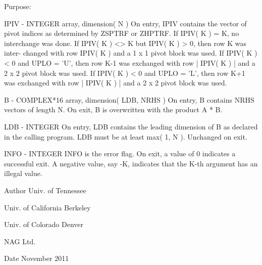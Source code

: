 \begin{DoxyParagraph}{Purpose\+: }
\begin{DoxyVerb}
  IPIV   - INTEGER array, dimension( N )
           On entry, IPIV contains the vector of pivot indices as
           determined by ZSPTRF or ZHPTRF.
           If IPIV( K ) = K, no interchange was done.
           If IPIV( K ) <> K but IPIV( K ) > 0, then row K was inter-
           changed with row IPIV( K ) and a 1 x 1 pivot block was used.
           If IPIV( K ) < 0 and UPLO = 'U', then row K-1 was exchanged
           with row | IPIV( K ) | and a 2 x 2 pivot block was used.
           If IPIV( K ) < 0 and UPLO = 'L', then row K+1 was exchanged
           with row | IPIV( K ) | and a 2 x 2 pivot block was used.

  B      - COMPLEX*16 array, dimension( LDB, NRHS )
           On entry, B contains NRHS vectors of length N.
           On exit, B is overwritten with the product A * B.

  LDB    - INTEGER
           On entry, LDB contains the leading dimension of B as
           declared in the calling program.  LDB must be at least
           max( 1, N ).
           Unchanged on exit.

  INFO   - INTEGER
           INFO is the error flag.
           On exit, a value of 0 indicates a successful exit.
           A negative value, say -K, indicates that the K-th argument
           has an illegal value.\end{DoxyVerb}
 
\end{DoxyParagraph}
\begin{DoxyAuthor}{Author}
Univ. of Tennessee 

Univ. of California Berkeley 

Univ. of Colorado Denver 

N\+A\+G Ltd. 
\end{DoxyAuthor}
\begin{DoxyDate}{Date}
November 2011 
\end{DoxyDate}
\hypertarget{group__complex16__lin_ga20022a8d9003ce2c4853d7f926d80c12}{}
